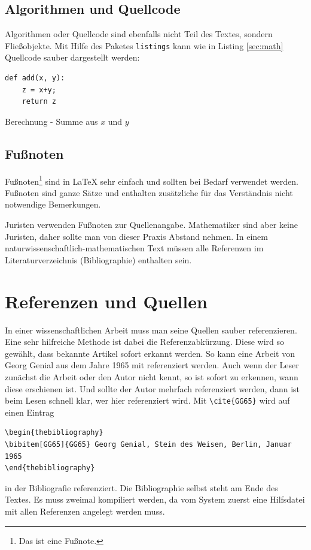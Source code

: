 \documentclass[10pt]{report}
\begin{document}
\subsection{Algorithmen und Quellcode}

Algorithmen oder Quellcode sind ebenfalls nicht Teil des Textes, sondern Flie\ss{}objekte. Mit Hilfe des Paketes \verb|listings| kann wie in Listing \ref{sec:math} Quellcode sauber dargestellt werden:
\begin{listing}[htbp] %
\begin{lstlisting}
def add(x, y):
    z = x+y;
    return z
\end{lstlisting}
\caption{Berechnung - Summe aus $x$ und $y$}
\label{alg:01}
\end{listing}

\subsection{Fu\ss{}noten}

Fu\ss{}noten\footnote{Das ist eine Fu\ss{}note.} sind in \LaTeX{} sehr einfach und sollten bei Bedarf verwendet werden. Fu\ss{}noten sind ganze S\"atze und enthalten zus\"atzliche f\"ur das Verst\"andnis nicht notwendige Bemerkungen.

Juristen verwenden Fu\ss{}noten zur Quellenangabe. Mathematiker sind aber keine Juristen, daher sollte man von dieser Praxis Abstand nehmen. In einem naturwissenschaftlich-mathematischen Text m\"ussen alle Referenzen im Literaturverzeichnis (Bibliographie) enthalten sein.

\section{Referenzen und Quellen}

In einer wissenschaftlichen Arbeit muss man seine Quellen sauber referenzieren. Eine sehr hilfreiche Methode ist dabei die Referenzabk\"urzung. Diese wird so gew\"ahlt, dass bekannte Artikel sofort erkannt werden. So kann eine Arbeit von Georg Genial aus dem Jahre 1965 mit \cite{GG65} referenziert werden. Auch wenn der Leser zun\"achst die Arbeit oder den Autor nicht kennt, so ist sofort zu erkennen, wann diese erschienen ist. Und sollte der Autor mehrfach referenziert werden, dann ist beim Lesen schnell klar, wer hier referenziert wird. Mit \verb|\cite{GG65}|  wird auf einen Eintrag 
\begin{verbatim}
\begin{thebibliography}
\bibitem[GG65]{GG65} Georg Genial, Stein des Weisen, Berlin, Januar 1965
\end{thebibliography}
\end{verbatim}
in der Bibliografie referenziert. Die Bibliographie selbst steht am Ende des Textes. Es muss zweimal kompiliert werden, da vom System zuerst eine Hilfsdatei mit allen Referenzen angelegt werden muss.
\end{document}
